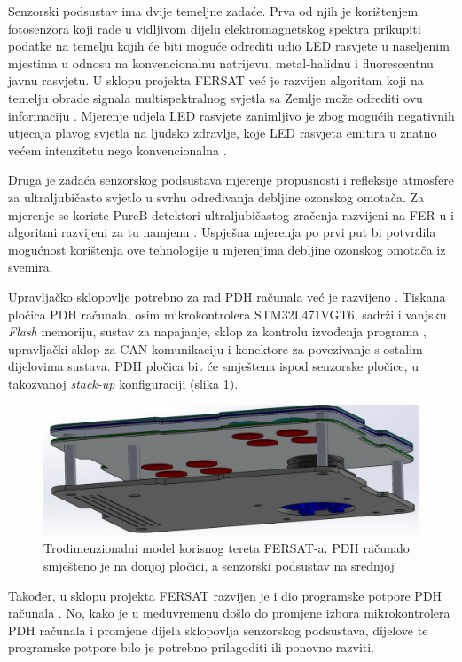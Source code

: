 Senzorski podsustav ima dvije temeljne zadaće. Prva od njih je korištenjem fotosenzora koji rade u vidljivom dijelu elektromagnetskog spektra prikupiti podatke na temelju kojih će biti moguće odrediti udio LED rasvjete u naseljenim mjestima u odnosu na konvencionalnu natrijevu, metal-halidnu i fluorescentnu javnu rasvjetu. U sklopu projekta FERSAT već je razvijen algoritam koji na temelju obrade signala multispektralnog svjetla sa Zemlje može odrediti ovu informaciju \cite{diplomski_jakov_tutavac}. Mjerenje udjela LED rasvjete zanimljivo je zbog mogućih negativnih utjecaja plavog svjetla na ljudsko zdravlje, koje LED rasvjeta emitira u znatno većem intenzitetu nego konvencionalna \cite{falchi_light_pollution}.

Druga je zadaća senzorskog podsustava mjerenje propusnosti i refleksije atmosfere za ultraljubičasto svjetlo u svrhu određivanja debljine ozonskog omotača. Za mjerenje se koriste PureB detektori ultraljubičastog zračenja razvijeni na FER-u \cite{diplomski_filip_bogdanovic} i algoritmi razvijeni za tu namjenu \cite{zavrsni_kristian_stepancic}. Uspješna mjerenja po prvi put bi potvrdila mogućnost korištenja ove tehnologije u mjerenjima debljine ozonskog omotača iz svemira.

Upravljačko sklopovlje potrebno za rad PDH računala već je razvijeno \cite{zavrsni_filip_juric}. Tiskana pločica PDH računala, osim mikrokontrolera STM32L471VGT6, sadrži i vanjsku \textit{Flash} memoriju, sustav za napajanje, sklop za kontrolu izvođenja programa , upravljački sklop za CAN komunikaciju i konektore za povezivanje s ostalim dijelovima sustava. PDH pločica bit će smještena ispod senzorske pločice, u takozvanoj \textit{stack-up} konfiguraciji (slika \ref{fig:fersat_3d}).

\begin{figure}[htb]
    \centering
    \includegraphics[width=\textwidth]{slike/fersat_3d.png}
    \caption{Trodimenzionalni model korisnog tereta FERSAT-a. PDH računalo smješteno je na donjoj pločici, a senzorski podsustav na srednjoj \cite{zavrsni_filip_juric}}
    \label{fig:fersat_3d}
\end{figure}

Također, u sklopu projekta FERSAT razvijen je i dio programske potpore PDH računala \cite{diplomski_goran_petrak}. No, kako je u međuvremenu došlo do promjene izbora mikrokontrolera PDH računala i promjene dijela sklopovlja senzorskog podsustava, dijelove te programske potpore bilo je potrebno prilagoditi ili ponovno razviti.